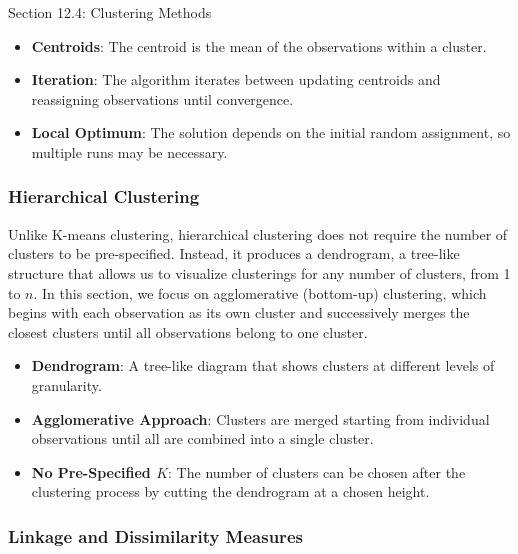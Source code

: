 \begin{notes}{Section 12.4: Clustering Methods}
    \begin{highlight}
        \begin{itemize}
            \item \textbf{Centroids}: The centroid is the mean of the observations within a cluster.
            \item \textbf{Iteration}: The algorithm iterates between updating centroids and reassigning observations until convergence.
            \item \textbf{Local Optimum}: The solution depends on the initial random assignment, so multiple runs may be necessary.
        \end{itemize}
    \end{highlight}
    
    \subsubsection*{Hierarchical Clustering}
    
    Unlike K-means clustering, hierarchical clustering does not require the number of clusters to be pre-specified. Instead, it produces a dendrogram, a tree-like structure that allows us to visualize 
    clusterings for any number of clusters, from 1 to \( n \). In this section, we focus on agglomerative (bottom-up) clustering, which begins with each observation as its own cluster and successively 
    merges the closest clusters until all observations belong to one cluster.
    
    \begin{highlight}
        \begin{itemize}
            \item \textbf{Dendrogram}: A tree-like diagram that shows clusters at different levels of granularity.
            \item \textbf{Agglomerative Approach}: Clusters are merged starting from individual observations until all are combined into a single cluster.
            \item \textbf{No Pre-Specified \( K \)}: The number of clusters can be chosen after the clustering process by cutting the dendrogram at a chosen height.
        \end{itemize}
    \end{highlight}
    
    \subsubsection*{Linkage and Dissimilarity Measures}
    

\end{notes}

